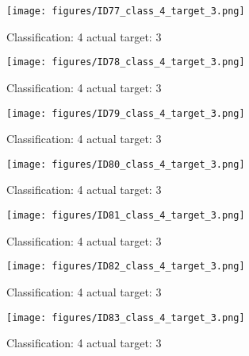 \begin{figure}[h!]
\begin{center}
\texttt{[image: figures/ID77\_class\_4\_target\_3.png]}
\end{center}
\caption{ Classification: 4 actual target: 3}
\label{fig:ID77_class_4_target_3}
\end{figure}
\begin{figure}[h!]
\begin{center}
\texttt{[image: figures/ID78\_class\_4\_target\_3.png]}
\end{center}
\caption{ Classification: 4 actual target: 3}
\label{fig:ID78_class_4_target_3}
\end{figure}
\begin{figure}[h!]
\begin{center}
\texttt{[image: figures/ID79\_class\_4\_target\_3.png]}
\end{center}
\caption{ Classification: 4 actual target: 3}
\label{fig:ID79_class_4_target_3}
\end{figure}
\begin{figure}[h!]
\begin{center}
\texttt{[image: figures/ID80\_class\_4\_target\_3.png]}
\end{center}
\caption{ Classification: 4 actual target: 3}
\label{fig:ID80_class_4_target_3}
\end{figure}
\begin{figure}[h!]
\begin{center}
\texttt{[image: figures/ID81\_class\_4\_target\_3.png]}
\end{center}
\caption{ Classification: 4 actual target: 3}
\label{fig:ID81_class_4_target_3}
\end{figure}
\begin{figure}[h!]
\begin{center}
\texttt{[image: figures/ID82\_class\_4\_target\_3.png]}
\end{center}
\caption{ Classification: 4 actual target: 3}
\label{fig:ID82_class_4_target_3}
\end{figure}
\begin{figure}[h!]
\begin{center}
\texttt{[image: figures/ID83\_class\_4\_target\_3.png]}
\end{center}
\caption{ Classification: 4 actual target: 3}
\label{fig:ID83_class_4_target_3}
\end{figure}
